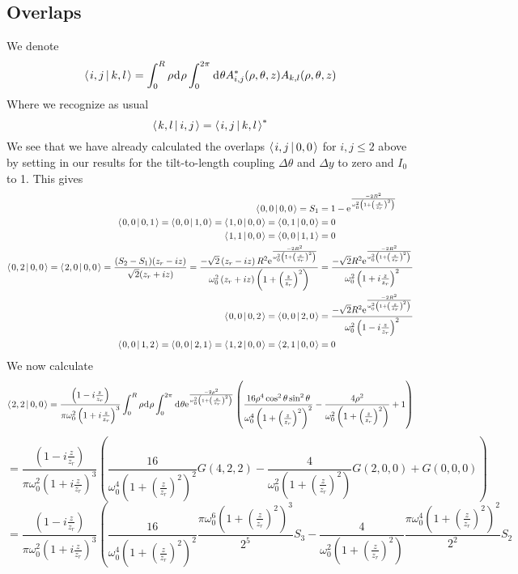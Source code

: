 \documentclass[11pt]{amsart}
\makeatletter
\newcommand{\e}{{\rm e}}				%
\newcommand{\msp}[1]{\mspace{#1mu}}		%
\newcommand{\0}{\varnothing}		%
\newcommand{\dd}{\msp{1} {\rm{d}} \msp{1}}	%
\newcommand{\brac}[2]{\left\langle\msp{2} #1\left\lvert \msp{3.5} #2 \right.\right\rangle}	%
\newcommand{\1}{!}
\newcommand{\2}{@}
\newcommand{\3}{\#}
\newcommand{\4}{\$}
\newcommand{\5}{\%}
\newcommand{\6}{$^\wedge$}
\newcommand{\7}{\&}
\newcommand{\8}{*}
\newcommand{\9}{(}
\makeatother
\begin{document}
\subsection{Overlaps}
We denote 
\[
\brac{i,j}{k,l} = \int_0^R \rho \dd \rho \int_0^{2\pi}\dd \theta A^*_{i,j}(\rho,\theta,z)A_{k,l}(\rho,\theta,z)
\]
Where we recognize as usual
\[
\brac{k,l}{i,j} = \brac{i,j}{k,l}^*
\]
We see that we have already calculated the overlaps $\brac{i,j}{0,0}$ for $i,j\le 2$  above by setting in our results for the tilt-to-length coupling $\Delta \theta$ and $\Delta y$ to zero and $I_0$ to 1. This gives
\begin{align*}
\brac{0,0}{0,0} = S_1 &= 1-\e^{\frac{-2R^2}{\omega_0^2\left(1+\left(\frac{z}{z_r}\right)^2\right)}}
\\
\brac{0,0}{0,1} = \brac{0,0}{1,0} = \brac{1,0}{0,0} = \brac{0,1}{0,0} &= 0
\\
\brac{1,1}{0,0} = \brac{0,0}{1,1} &= 0
\\
\brac{0,2}{0,0} = \brac{2,0}{0,0} = \frac{(S_2-S_1)(z_r-iz)}{\sqrt{2}(z_r+iz)} = \frac{-\sqrt{2}\left(z_r-iz\right)R^2\e^{\frac{-2R^2}{\omega_0^2\left(1+\left(\frac{z}{z_r}\right)^2\right)}}}{\omega_0^2\left(z_r+iz\right)\left(1+\left(\frac{z}{z_r}\right)^2\right)} &= \frac{-\sqrt{2}R^2\e^{\frac{-2R^2}{\omega_0^2\left(1+\left(\frac{z}{z_r}\right)^2\right)}}}{\omega_0^2\left(1+i\frac{z}{z_r}\right)^2}
\\
\brac{0,0}{0,2} = \brac{0,0}{2,0} &= \frac{-\sqrt{2}R^2\e^{\frac{-2R^2}{\omega_0^2\left(1+\left(\frac{z}{z_r}\right)^2\right)}}}{\omega_0^2\left(1-i\frac{z}{z_r}\right)^2}
\\
\brac{0,0}{1,2} = \brac{0,0}{2,1}=\brac{1,2}{0,0} = \brac{2,1}{0,0} &= 0
\end{align*}
We now calculate
\[
\brac{2,2}{0,0} = \frac{\left(1-i\frac{z}{z_r}\right)}{\pi\omega_0^2\left(1+i\frac{z}{z_r}\right)^3}\int_0^R\rho \dd \rho\int_0^{2\pi}\dd \theta \e^{\frac{-2\rho^2}{\omega_0^2\left(1+\left(\frac{z}{z_r}\right)^2\right)}}\left(\frac{16\rho^4\cos^2\theta\sin^2\theta}{\omega_0^4\left(1+\left(\frac{z}{z_r}\right)^2\right)^2}-\frac{4\rho^2}{\omega_0^2\left(1+\left(\frac{z}{z_r}\right)^2\right)}+1\right)
\]
\[
=\frac{\left(1-i\frac{z}{z_r}\right)}{\pi\omega_0^2\left(1+i\frac{z}{z_r}\right)^3}\left(\frac{16}{\omega_0^4\left(1+\left(\frac{z}{z_r}\right)^2\right)^2}G(4,2,2)-\frac{4}{\omega_0^2\left(1+\left(\frac{z}{z_r}\right)^2\right)}G(2,0,0)+G(0,0,0)\right)
\]
\[
=\frac{\left(1-i\frac{z}{z_r}\right)}{\pi\omega_0^2\left(1+i\frac{z}{z_r}\right)^3}\left(\frac{16}{\omega_0^4\left(1+\left(\frac{z}{z_r}\right)^2\right)^2}\frac{\pi\omega_0^6\left(1+\left(\frac{z}{z_r}\right)^2\right)^3}{2^5}S_3-\frac{4}{\omega_0^2\left(1+\left(\frac{z}{z_r}\right)^2\right)}\frac{\pi\omega_0^4\left(1+\left(\frac{z}{z_r}\right)^2\right)^2}{2^2}S_2\right.
\]
\end{document}
